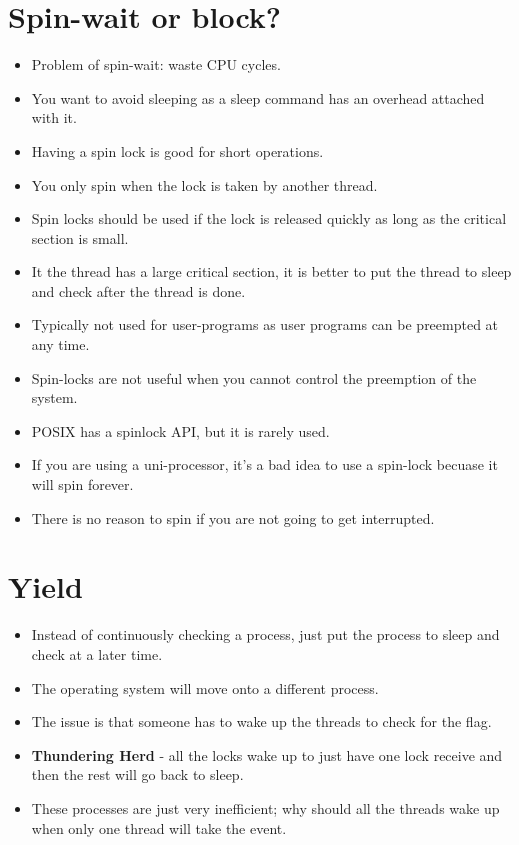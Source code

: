 \documentclass[]{article}
\begin{document}
\section{Spin-wait or block?}
\begin{itemize}
\item Problem of spin-wait: waste CPU cycles.
\item You want to avoid sleeping as a sleep command has an overhead attached
with it.
\item Having a spin lock is good for short operations.
\item You only spin when the lock is taken by another thread.
\item Spin locks should be used if the lock is released quickly as long as the
critical section is small.
\item It the thread has a large critical section, it is better to put the thread
to sleep and check after the thread is done.
\item Typically not used for user-programs as user programs can be preempted at
any time.
\item Spin-locks are not useful when you cannot control the preemption of the
system.
\item POSIX has a spinlock API, but it is rarely used.
\item If you are using a uni-processor, it's a bad idea to use a spin-lock
becuase it will spin forever.
\item There is no reason to spin if you are not going to get interrupted.
\end{itemize}

\section{Yield}
\begin{itemize}
\item Instead of continuously checking a process, just put the process to sleep
and check at a later time.
\item The operating system will move onto a different process.
\item The issue is that someone has to wake up the threads to check for the
flag.
\item \textbf{Thundering Herd} - all the locks wake up to just have one lock
receive and then the rest will go back to sleep.
\item These processes are just very inefficient; why should all the threads wake
up when only one thread will take the event.
\end{itemize}
\end{document}
